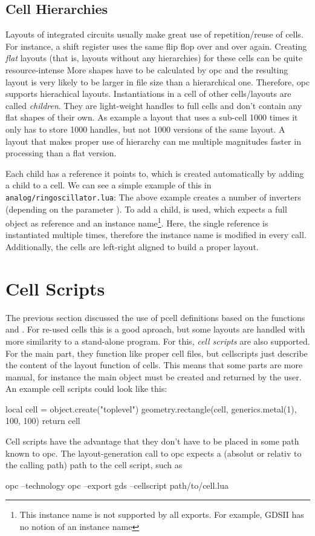 \subsection{Cell Hierarchies}
Layouts of integrated circuits usually make great use of repetition/reuse of cells.
For instance, a shift register uses the same flip flop over and over again.
Creating \emph{flat} layouts (that is, layouts without any hierarchies) for these cells can be quite resource-intense
More shapes have to be calculated by opc and the resulting layout is very likely to be larger in file size than a hierarchical one.
Therefore, opc supports hierachical layouts.
Instantiations in a cell of other cells/layouts are called \emph{children}.
They are light-weight handles to full cells and don't contain any flat shapes of their own.
As example a layout that uses a sub-cell 1000 times it only has to store 1000 handles, but not 1000 versions of the same layout.
A layout that makes proper use of hierarchy can me multiple magnitudes faster in processing than a flat version.

Each child has a reference it points to, which is created automatically by adding a child to a cell.
We can see a simple example of this in \texttt{analog/ringoscillator.lua}:
The above example creates a number of inverters (depending on the parameter ).
To add a child,  is used, which expects a full object as reference and an instance name\footnote{This instance name is not
supported by all exports. For example, GDSII has no notion of an instance name}.
Here, the single reference is instantiated multiple times, therefore the instance name is modified in every call.
Additionally, the cells are left-right aligned to build a proper layout.

\section{Cell Scripts}
The previous section discussed the use of pcell definitions based on the functions  and .
For re-used cells this is a good aproach, but some layouts are handled with more similarity to a stand-alone program.
For this, \emph{cell scripts} are also supported.
For the main part, they function like proper cell files, but cellscripts just describe the content of the layout function of cells.
This means that some parts are more manual, for instance the main object must be created and returned by the user.
An example cell scripts could look like this:
\begin{lualisting}
    local cell = object.create("toplevel")
    geometry.rectangle(cell, generics.metal(1), 100, 100)
    return cell
\end{lualisting}
Cell scripts have the advantage that they don't have to be placed in some path known to opc.
The layout-generation call to opc expects a (absolut or relativ to the calling path) path to the cell script, such as
\begin{shellcode}
    opc --technology opc --export gds --cellscript path/to/cell.lua
\end{shellcode}
